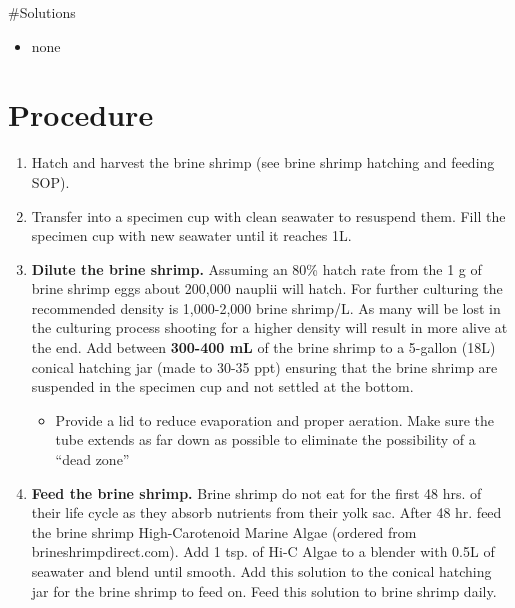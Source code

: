 \documentclass[
  letterpaper,
  DIV=11,
  numbers=noendperiod]{scrreprt}
\providecommand{\tightlist}{%
  \setlength{\itemsep}{0pt}\setlength{\parskip}{0pt}}\usepackage{longtable,booktabs,array}
\begin{document}
\#Solutions

\begin{itemize}
\tightlist
\item
  none
\end{itemize}

\hypertarget{procedure-9}{%
\section{Procedure}\label{procedure-9}}

\begin{enumerate}
\def\labelenumi{\arabic{enumi}.}
\item
  Hatch and harvest the brine shrimp (see brine shrimp hatching and
  feeding SOP).
\item
  Transfer into a specimen cup with clean seawater to resuspend them.
  Fill the specimen cup with new seawater until it reaches 1L.
\item
  \textbf{Dilute the brine shrimp.} Assuming an 80\% hatch rate from the
  1 g of brine shrimp eggs about 200,000 nauplii will hatch. For further
  culturing the recommended density is 1,000-2,000 brine shrimp/L. As
  many will be lost in the culturing process shooting for a higher
  density will result in more alive at the end. Add between
  \textbf{300-400 mL} of the brine shrimp to a 5-gallon (18L) conical
  hatching jar (made to 30-35 ppt) ensuring that the brine shrimp are
  suspended in the specimen cup and not settled at the bottom.

  \begin{itemize}
  \tightlist
  \item
    Provide a lid to reduce evaporation and proper aeration. Make sure
    the tube extends as far down as possible to eliminate the
    possibility of a ``dead zone''
  \end{itemize}
\item
  \textbf{Feed the brine shrimp.} Brine shrimp do not eat for the first
  48 hrs. of their life cycle as they absorb nutrients from their yolk
  sac. After 48 hr. feed the brine shrimp High-Carotenoid Marine Algae
  (ordered from brineshrimpdirect.com). Add 1 tsp. of Hi-C Algae to a
  blender with 0.5L of seawater and blend until smooth. Add this
  solution to the conical hatching jar for the brine shrimp to feed on.
  Feed this solution to brine shrimp daily.


\end{enumerate}
\end{document}
